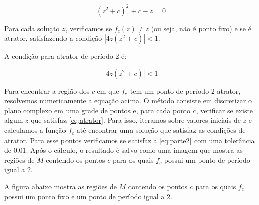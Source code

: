 \begin{enumerate}[label=(\alph*)]
\begin{itemize}
                \begin{equation}
                    (z^2 + c)^2 + c - z = 0
                    \label{eq:parte2}                    
                \end{equation}

                Para cada solução \( z \), verificamos se \( f_c(z) \neq z \) (ou seja, não é ponto fixo) e se é atrator, satisfazendo a condição \( |4z(z^2 + c)| < 1 \).

                A condição para atrator de período 2 é:

                \begin{equation}
                    |4z(z^2 + c)| < 1
                    \label{eq:atrator}                    
                \end{equation}

                Para encontrar a região dos \( c \) em que \( f_c \) tem um ponto de período 2 atrator, resolvemos numericamente a equação acima. O método consiste em discretizar o plano complexo em uma grade de pontos e, para cada ponto \( c \), verificar se existe algum \( z \) que satisfaz \autoref{eq:atrator}. Para isso, iteramos sobre valores iniciais de \( z \) e calculamos a função \( f_c \) até encontrar uma solução que satisfaz as condições de atrator. Para esse pontos verificamos se satisfaz a \autoref{eq:parte2} com uma tolerância de 0.01. Após o cálculo, o resultado é salvo como uma imagem que mostra as regiões de \( M \) contendo os pontos \( c \) para os quais \( f_c \) possui um ponto de período igual a 2.

                A figura abaixo mostra as regiões de \( M \) contendo os pontos \( c \) para os quais \( f_c \) possui um ponto fixo e um ponto de período igual a 2.


\end{itemize}
\end{enumerate}
